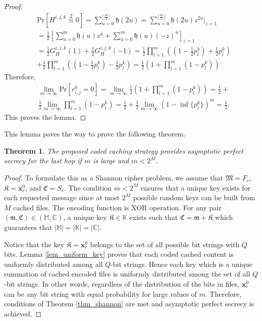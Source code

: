 \documentclass[10pt,journal]{IEEEtran}
\newtheorem{thm}{Theorem}
\begin{document}
{\begin{proof}
 \begin{align}
 & \mathrm{Pr}[H^{i,j,k} \stackrel{2}{\equiv} 0] = 
  \sum_{u=0}^{\lfloor \frac{m}{2} \rfloor} \mathfrak{h}(2 u) =
  \sum_{u=0}^{\lfloor \frac{m}{2} \rfloor} \mathfrak{h}(2 u) z^{2 u}
  \biggr\rvert_{z=1}  \nonumber \\
  &= \frac{1}{2} \left[
  \sum_{u=0}^{m} \mathfrak{h}( u) z^{ u} +  \sum_{u=0}^{m} \mathfrak{h}( u) (-z)^{ u}
  \right]_{z=1}  \nonumber \\
&=\frac{1}{2} G_H^{i,j,k} (1) +  \frac{1}{2} G_H^{i,j,k} (-1) 
=\frac{1}{2}\prod_{l=1}^m \left( (1-\frac{1}{2} p_l^k)  + 
  \frac{1}{2} p_l^k  \right) \nonumber \\
 &+  \frac{1}{2} \prod_{l=1}^m \left( (1-\frac{1}{2} p_l^k) 
  - \frac{1}{2} p_l^k  \right) 
  =\frac{1}{2} \left( 1 + \prod_{l=1}^m  \left(1-p_l^k \right) \right) \nonumber 
\end{align}
Therefore,
\begin{align}
 &\lim_{m \to \infty} \mathrm{Pr}[r^k_{i,j} = 0] 
 = \lim_{m \to \infty} \frac{1}{2} \left( 1 + \prod_{l=1}^m 
 \left(1-p_l^k \right) \right) = \frac{1}{2}+ \nonumber \\
 & \frac{1}{2} \lim_{m \to \infty}  \prod_{l=1}^m 
 \left(1-p_l^k \right) = \frac{1}{2}+ \frac{1}{2} \lim_{m \to \infty}   \left(1-\inf \{p_l^k\} \right)^m = \frac{1}{2}. \nonumber
 \label{proof_end}
\end{align}
This proves the lemma.
\end{proof}
This lemma paves the way to prove the following theorem. 
\begin{thm}{\em The proposed coded caching strategy provides asymptotic perfect secrecy for the last  hop if $m$ is large and $m <2^M$.
}\label{thm_secrecy}
\end{thm}
\begin{proof}
To formulate this as a Shannon cipher problem, we assume that $\mathfrak{M}=F_r$, $\mathfrak{K}=\mathbf{x}^0_r$, and $\mathfrak{C} = S_r$. The condition $m < 2^M$ ensures that a unique key exists for each requested message since at most $2^M$ possible random keys can be built from  $M$ cached files. The encoding function is XOR operation. For any pair $(\mathfrak{m}, \mathfrak{C}) \in (\mathbb{M}, \mathbb{C})$, a unique key $\mathfrak{K} \in \mathbb{K}$ exists such that $\mathfrak{C} = \mathfrak{m} + \mathfrak{K}$ which guarantees that $|\mathbb{M}|=|\mathbb{K}|=|\mathbb{C}|$.
 
Notice that the key  $\mathfrak{K}=\mathbf{x}^0_r$ belongs to the set of all possible bit strings with $Q$ bits. Lemma \ref{lem_uniform_key} proves that each {coded cached content is uniformly distributed among all $Q$-bit strings. Hence each key which} is a unique summation of cached encoded files {is uniformly distributed among the set of all $Q$-bit strings.}  In other words, regardless of the distribution of the bits in files, $\mathbf{x}^0_r$ can be any bit string with equal probability for large values of $m$. Therefore, conditions of Theorem \ref{thm_shannon} are met and asymptotic perfect secrecy is achieved. 
\end{proof}

}
\end{document}
